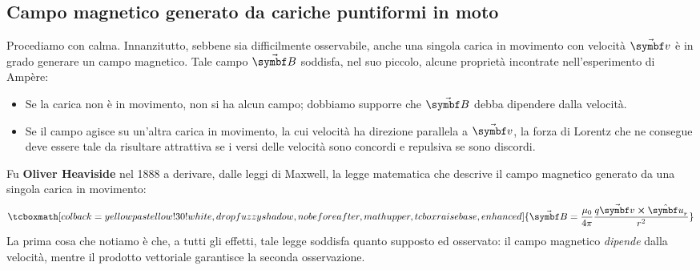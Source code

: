 \subsection{Campo magnetico generato da cariche puntiformi in moto}
Procediamo con calma. Innanzitutto, sebbene sia difficilmente osservabile, anche una singola carica in movimento con velocità $\vba{v}$ è in grado generare un campo magnetico. Tale campo $\vba{B}$ soddisfa, nel suo piccolo, alcune proprietà incontrate nell'esperimento di Ampère:
\begin{itemize}
	\item Se la carica non è in movimento, non si ha alcun campo; dobbiamo supporre che $\vba{B}$ debba dipendere dalla velocità.
	\item Se il campo agisce su un'altra carica in movimento, la cui velocità ha direzione parallela a $\vba{v}$, la forza di Lorentz che ne consegue deve essere tale da risultare attrattiva se i versi delle velocità sono concordi e repulsiva se sono discordi. 
\end{itemize}
Fu \textbf{Oliver Heaviside} nel 1888 a derivare, dalle leggi di Maxwell, la legge matematica che descrive il campo magnetico generato da una singola carica in movimento:
\begin{equation}
	\tcboxmath[colback=yellowpastellow!30!white,drop fuzzy shadow, nobeforeafter, math upper, tcbox raise base, enhanced]{\vba{B}=\frac{\mu_0}{4\pi}\frac{q\vba{v}\cross\vbh{u}_r}{r^2}}
\end{equation}
La prima cosa che notiamo è che, a tutti gli effetti, tale legge soddisfa quanto supposto ed osservato: il campo magnetico \textit{dipende} dalla velocità, mentre il prodotto vettoriale garantisce la seconda osservazione.

